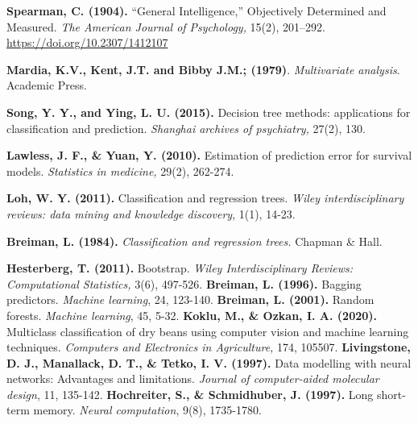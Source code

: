 \begin{thebibliography}{99}
\textbf{Spearman, C. (1904).} “General Intelligence,” Objectively Determined and Measured. \emph{The American Journal of Psychology,} 15(2), 201–292. \url{https://doi.org/10.2307/1412107}

\textbf{Mardia, K.V., Kent, J.T. and Bibby J.M.; (1979)}. \emph{Multivariate analysis}. Academic Press.

\textbf{Song, Y. Y., and Ying, L. U. (2015).} Decision tree methods: applications for classification and prediction. \emph{Shanghai archives of psychiatry,} 27(2), 130.

 \textbf{Lawless, J. F., \& Yuan, Y. (2010).} Estimation of prediction error for survival models. \emph{Statistics in medicine,} 29(2), 262-274.

\textbf{Loh, W. Y. (2011).} Classification and regression trees.\emph{ Wiley interdisciplinary reviews: data mining and knowledge discovery}, 1(1), 14-23.

\textbf{Breiman, L. (1984).} \emph{Classification and regression trees. }Chapman \& Hall.

\textbf{Hesterberg, T. (2011).} Bootstrap. \emph{Wiley Interdisciplinary Reviews: Computational Statistics,} 3(6), 497-526.
\textbf{Breiman, L. (1996).} Bagging predictors. \emph{Machine learning}, 24, 123-140.
\textbf{Breiman, L. (2001).} Random forests. \emph{Machine learning}, 45, 5-32.
\textbf{Koklu, M., \& Ozkan, I. A. (2020).} Multiclass classification of dry beans using computer vision and machine learning techniques. \emph{Computers and Electronics in Agriculture,} 174, 105507.
\textbf{Livingstone, D. J., Manallack, D. T., \& Tetko, I. V. (1997).} Data modelling with neural networks: Advantages and limitations. \emph{Journal of computer-aided molecular design}, 11, 135-142.
\textbf{Hochreiter, S., \& Schmidhuber, J. (1997).} Long short-term memory.\emph{ Neural computation}, 9(8), 1735-1780.
\end{thebibliography}
 